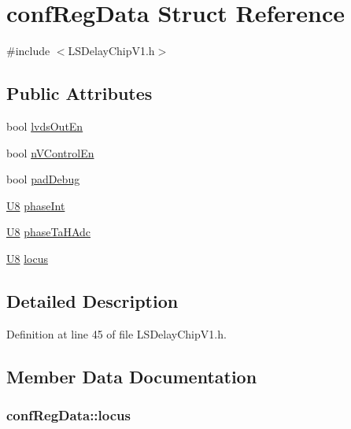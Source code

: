 \hypertarget{structconfRegData}{
\section{confRegData Struct Reference}
\label{structconfRegData}
}


{\ttfamily \#include $<$LSDelayChipV1.h$>$}\subsection*{Public Attributes}
\begin{DoxyCompactItemize}
\item 
bool \hyperlink{structconfRegData_a709d8d691ef0c8ea5c4c03aac3d851f1}{lvdsOutEn}
\item 
bool \hyperlink{structconfRegData_a62f72429bde3ede255f6d8dfe1401c37}{nVControlEn}
\item 
bool \hyperlink{structconfRegData_a4e98d082c44e34995224bd242da493d0}{padDebug}
\item 
\hyperlink{LSDelayChipV1_8h_a3cb25ca6f51f003950f9625ff05536fc}{U8} \hyperlink{structconfRegData_aee4fd08aceaaf19fcb8edfe8aa50f5ab}{phaseInt}
\item 
\hyperlink{LSDelayChipV1_8h_a3cb25ca6f51f003950f9625ff05536fc}{U8} \hyperlink{structconfRegData_a2e471f30b32e57270cb2edb0e420cf1b}{phaseTaHAdc}
\item 
\hyperlink{LSDelayChipV1_8h_a3cb25ca6f51f003950f9625ff05536fc}{U8} \hyperlink{structconfRegData_a0ed9976dd55237ee70ba3621b0f4f58c}{locus}
\end{DoxyCompactItemize}


\subsection{Detailed Description}


Definition at line 45 of file LSDelayChipV1.h.

\subsection{Member Data Documentation}
\hypertarget{structconfRegData_a0ed9976dd55237ee70ba3621b0f4f58c}{
\subsubsection[{locus}]{ {\bf confRegData::locus}}}
\label{structconfRegData_a0ed9976dd55237ee70ba3621b0f4f58c}


